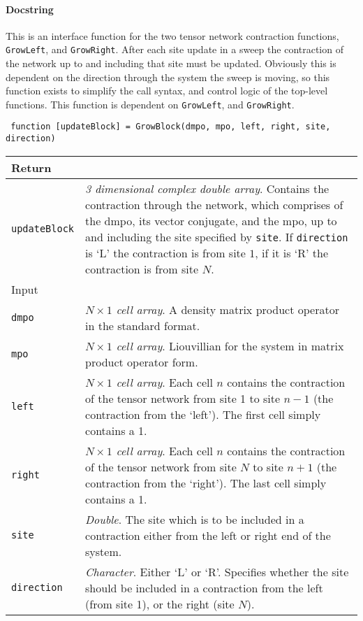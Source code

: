  \paragraph{Docstring} This is an interface function for the two tensor network contraction functions, \lstinline$GrowLeft$, and \lstinline$GrowRight$. After each site update in a sweep the contraction of the network up to and including that site must be updated. Obviously this is dependent on the direction through the system the sweep is moving, so this function exists to simplify the call syntax, and control logic of the top-level functions. This function is dependent on \lstinline$GrowLeft$, and \lstinline$GrowRight$.
 \begin{lstlisting}
 function [updateBlock] = GrowBlock(dmpo, mpo, left, right, site, direction) \end{lstlisting}
 \begin{longtabu}{X[1,1]X[4,1]}
 \hline
 Return & \\ \hline
 \lstinline$updateBlock$ & \emph{3 dimensional complex double array}. Contains the contraction through the network, which comprises of the dmpo, its vector conjugate, and the mpo, up to and including the site specified by \lstinline$site$. If \lstinline$direction$ is `L' the contraction is from site \(1\), if it is `R' the contraction is from site \(N\). \\ \hline
 Input & \\ \hline
 \lstinline$dmpo$ & \emph{\(N \times 1\) cell array}. A density matrix product operator in the standard format. \\
 \lstinline$mpo$ & \emph{\(N \times 1\) cell array}. Liouvillian for the system in matrix product operator form. \\
 \lstinline$left$ & \emph{\(N \times 1\) cell array}. Each cell \(n\) contains the contraction of the tensor network from site 1 to site \(n-1\) (the contraction from the `left'). The first cell simply contains a 1. \\
 \lstinline$right$ & \emph{\(N \times 1\) cell array}. Each cell \(n\) contains the contraction of the tensor network from site \(N\) to site \(n+1\) (the contraction from the `right'). The last cell simply contains a 1. \\
 \lstinline$site$ & \emph{Double}. The site which is to be included in a contraction either from the left or right end of the system.  \\
 \lstinline$direction$ & \emph{Character}. Either `L' or `R'. Specifies whether the site should be included in a contraction from the left (from site 1), or the right (site \(N\)). \\
 \hline
 \end{longtabu}

